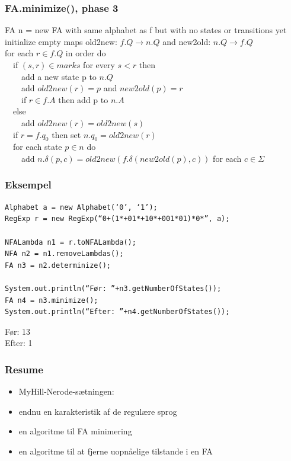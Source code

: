 \documentclass[]{beamer}
\begin{document}
\begin{frame}
\frametitle{FA.minimize(), phase 3}
FA n = new FA with same alphabet as f
       but with no states or transitions yet\\
initialize empty maps old2new: $f.Q \rightarrow  n.Q$  and new2old: $n.Q \rightarrow  f.Q$\\
for each $r\in f.Q$ in order do\\
\ \ if $(s,r)\in marks$ for every $s<r$ then\\
\ \ \ \ add a new state p to $n.Q$\\
\ \ \ \ add $old2new(r) = p$ and $new2old(p) = r$\\
\ \ \ \ if $r\in f.A$ then add p to $n.A$\\
\ \ else\\
\ \ \ \ add $old2new(r) = old2new(s)$\\
\ \ if $r = f.q_0$  then set $n.q_0 = old2new(r)$\\
\ \ for each state $p \in n$ do\\
\ \ \ \ add $n.\delta(p,c) = old2new(f.\delta (new2old(p),c))$  for each $c\in \Sigma$ 
\end{frame}

\begin{frame}[fragile]

\frametitle{Eksempel}
\begin{verbatim}
Alphabet a = new Alphabet(‘0’, ‘1’);
RegExp r = new RegExp(“0+(1*+01*+10*+001*01)*0*”, a);

NFALambda n1 = r.toNFALambda();
NFA n2 = n1.removeLambdas();
FA n3 = n2.determinize();

System.out.println(“Før: ”+n3.getNumberOfStates());
FA n4 = n3.minimize();
System.out.println(“Efter: ”+n4.getNumberOfStates());
\end{verbatim}
\pause
Før: 13\\
\pause
Efter: 1
\end{frame}
\begin{frame}
\frametitle{Resume}
\begin{itemize}
\item MyHill-Nerode-sætningen: 
\item endnu en karakteristik af de regulære sprog
\item en algoritme til FA minimering
\item en algoritme til at fjerne uopnåelige tilstande i en FA
\end{itemize}
\end{frame}
\end{document}
